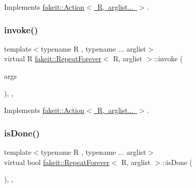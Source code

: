Implements \mbox{\hyperlink{structfakeit_1_1Action_a85503300bf8134ce55761db5f643b00c}{fakeit\+::\+Action$<$ R, arglist... $>$}}.

\mbox{\label{structfakeit_1_1RepeatForever_a9fcab18dc26a1f74a22e82a775f06ea6}} 
\subsubsection{\texorpdfstring{invoke()}{invoke()}\hspace{0.1cm}{\footnotesize\ttfamily [9/9]}}
{\footnotesize\ttfamily template$<$typename R , typename ... arglist$>$ \\
virtual R \mbox{\hyperlink{structfakeit_1_1RepeatForever}{fakeit\+::\+Repeat\+Forever}}$<$ R, arglist $>$\+::invoke (\begin{DoxyParamCaption}\item[{const \mbox{\hyperlink{namespacefakeit_a476a37a598825e1b5dd67b3a176491a1}{Arguments\+Tuple}}$<$ arglist... $>$ \&}]{args }\end{DoxyParamCaption})\hspace{0.3cm}{\ttfamily [inline]}, {\ttfamily [override]}, {\ttfamily [virtual]}}



Implements \mbox{\hyperlink{structfakeit_1_1Action_a85503300bf8134ce55761db5f643b00c}{fakeit\+::\+Action$<$ R, arglist... $>$}}.

\mbox{\label{structfakeit_1_1RepeatForever_af5922669a521e99ca18218972b86cb87}} 
\subsubsection{\texorpdfstring{isDone()}{isDone()}\hspace{0.1cm}{\footnotesize\ttfamily [1/9]}}
{\footnotesize\ttfamily template$<$typename R , typename ... arglist$>$ \\
virtual bool \mbox{\hyperlink{structfakeit_1_1RepeatForever}{fakeit\+::\+Repeat\+Forever}}$<$ R, arglist $>$\+::is\+Done (\begin{DoxyParamCaption}{ }\end{DoxyParamCaption})\hspace{0.3cm}{\ttfamily [inline]}, {\ttfamily [override]}, {\ttfamily [virtual]}}




